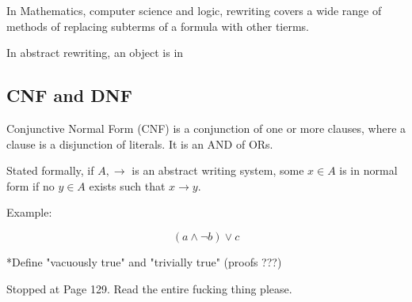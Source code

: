 \documentclass[12pt]{article}
\begin{document}
In Mathematics, computer science and logic, rewriting covers a wide range of
methods of replacing subterms of a formula with other tierms.

In abstract rewriting, an object is in 

\subsection{CNF and DNF}

Conjunctive Normal Form (CNF) is a conjunction of one or more clauses, where
a clause is a disjunction of literals. It is an AND of ORs.

Stated formally, if $A, \to$ is an abstract writing system, some $x \in A$ is
in normal form if no $y \in A$ exists such that $x \to y$.

Example:

\begin{equation}
(a \land \neg b) \lor c
\end{equation}

*Define "vacuously true" and "trivially true" (proofs ???)

Stopped at Page 129. Read the entire fucking thing please.
\end{document}
